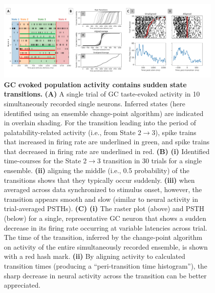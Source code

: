 \begin{refsection}
\begin{figure}
\includegraphics[width=\linewidth]{mahmood_22_figures/fig3-0.png}
\caption{\textbf{GC evoked population activity contains sudden state transitions.} \textbf{(A)} A single trial of GC taste-evoked activity in 10 simultaneously recorded single neurons. Inferred states (here identified using an ensemble change-point algorithm) are indicated in overlain shading. For the transition leading into the period of palatability-related activity (i.e., from State 2$\rightarrow$3), spike trains that increased in firing rate are underlined in green, and spike trains that decreased in firing rate are underlined in red. \textbf{(B) (i)}  Identified time-courses for the State 2$\rightarrow$3 transition in 30 trials for a single ensemble. \textbf{(ii)} aligning the middle (i.e., 0.5 probability) of the transitions shows that they typically occur suddenly. \textbf{(iii)} when averaged across data synchronized to stimulus onset, however, the transition appears smooth and slow (similar to neural activity in trial-averaged PSTHs). \textbf{(C) (i)} The raster plot (above) and PSTH (below) for a single, representative GC neuron that shows a sudden decrease in its firing rate occurring at variable latencies across trial. The time of the transition, inferred by the change-point algorithm on activity of the entire simultaneously recorded ensemble, is shown with a red hash mark. \textbf{(ii)} By aligning activity to calculated transition times (producing a “peri-transition time histogram”), the sharp decrease in neural activity across the transition can be better appreciated.}
\label{fig:wrapfig}
\end{figure}


\end{refsection}
